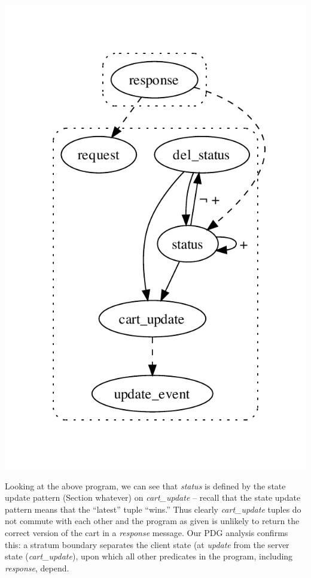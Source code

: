 \includegraphics[width=0.65\linewidth]{vizza_straw.pdf}

Looking at the above program, we can see that {\em status} is defined by the
state update pattern (Section whatever) on {\em cart\_update} -- recall that
the state update pattern means that the ``latest'' tuple ``wins.'' Thus clearly
{\em cart\_update} tuples do not commute with each other
and the program as
given is unlikely to return the correct version of the cart in a {\em response}
message.  Our PDG analysis confirms this: a stratum boundary separates the client state
(at {\em update} from the server state ({\em cart\_update}), upon which all other 
predicates in the program, including {\em response}, depend.

